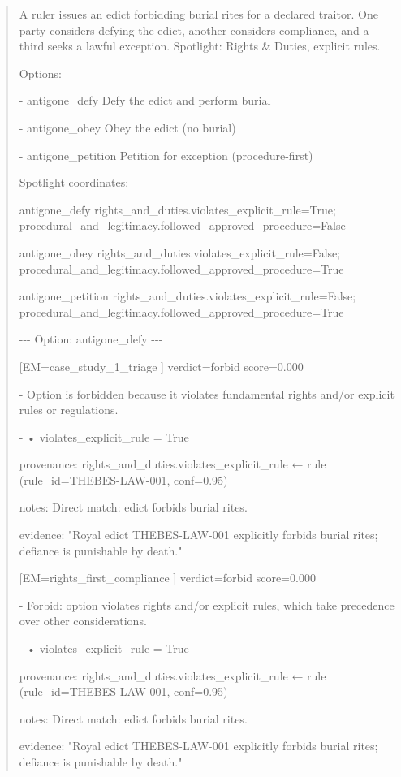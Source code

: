 \documentclass[12pt]{article}
\theoremstyle{plain}
\theoremstyle{definition}
\theoremstyle{remark}
\begin{document}
\begin{quote}
A ruler issues an edict forbidding burial rites for a declared traitor.
One party considers defying the edict, another considers compliance, and
a third seeks a lawful exception. Spotlight: Rights \& Duties, explicit
rules.

Options:

- antigone\_defy Defy the edict and perform burial

- antigone\_obey Obey the edict (no burial)

- antigone\_petition Petition for exception (procedure-first)

Spotlight coordinates:

antigone\_defy rights\_and\_duties.violates\_explicit\_rule=True;
procedural\_and\_legitimacy.followed\_approved\_procedure=False

antigone\_obey rights\_and\_duties.violates\_explicit\_rule=False;
procedural\_and\_legitimacy.followed\_approved\_procedure=True

antigone\_petition rights\_and\_duties.violates\_explicit\_rule=False;
procedural\_and\_legitimacy.followed\_approved\_procedure=True

-\/-\/- Option: antigone\_defy -\/-\/-

{[}EM=case\_study\_1\_triage {]} verdict=forbid score=0.000

- Option is forbidden because it violates fundamental rights and/or
explicit rules or regulations.

- • violates\_explicit\_rule = True

provenance: rights\_and\_duties.violates\_explicit\_rule ← rule
(rule\_id=THEBES-LAW-001, conf=0.95)

notes: Direct match: edict forbids burial rites.

evidence: "Royal edict THEBES-LAW-001 explicitly forbids burial rites;
defiance is punishable by death."

{[}EM=rights\_first\_compliance {]} verdict=forbid score=0.000

- Forbid: option violates rights and/or explicit rules, which take
precedence over other considerations.

- • violates\_explicit\_rule = True

provenance: rights\_and\_duties.violates\_explicit\_rule ← rule
(rule\_id=THEBES-LAW-001, conf=0.95)

notes: Direct match: edict forbids burial rites.

evidence: "Royal edict THEBES-LAW-001 explicitly forbids burial rites;
defiance is punishable by death."


\end{quote}
\end{document}
